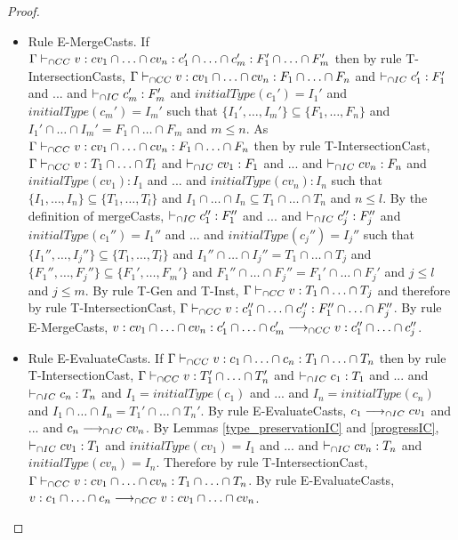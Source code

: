 \documentclass[a4paper]{article}
\begin{document}
\begin{proof}
\begin{itemize}
    \item Rule E-MergeCasts.
    If $\Gamma \vdash_{\cap CC} v : cv_1 \cap \ldots \cap cv_n : c_1' \cap \ldots \cap c_m' : F_1' \cap \ldots \cap F_m'$ then by rule T-IntersectionCasts, $\Gamma \vdash_{\cap CC} v : cv_1 \cap \ldots \cap cv_n : F_1 \cap \ldots \cap F_n$ and $\vdash_{\cap IC} c_1' : F_1'$ and ... and $\vdash_{\cap IC} c_m' : F_m'$ and $initialType(c_1') = I_1'$ and $initialType(c_m') = I_m'$ such that $\{I_1', \ldots, I_m'\} \subseteq \{F_1, \ldots, F_n\}$ and $I_1' \cap \ldots \cap I_m' = F_1 \cap \ldots \cap F_m$ and $m \leq n$.
    As $\Gamma \vdash_{\cap CC} v : cv_1 \cap \ldots \cap cv_n : F_1 \cap \ldots \cap F_n$ then by rule T-IntersectionCast, $\Gamma \vdash_{\cap CC} v : T_1 \cap \ldots \cap T_l$ and $\vdash_{\cap IC} cv_1 : F_1$ and ... and $\vdash_{\cap IC} cv_n : F_n$ and $initialType(cv_1) : I_1$ and ... and $initialType(cv_n) : I_n$ such that $\{I_1, \ldots, I_n\} \subseteq \{T_1, \ldots, T_l\}$ and $I_1 \cap \ldots \cap I_n \subseteq T_1 \cap \ldots \cap T_n$ and $n \leq l$.
    By the definition of mergeCasts, $\vdash_{\cap IC} c_1'' : F_1''$ and ... and $\vdash_{\cap IC} c_j'' : F_j''$ and $initialType(c_1'') = I_1''$ and ... and $initialType(c_j'') = I_j''$ such that $\{I_1'', \ldots, I_j''\} \subseteq \{T_1, \ldots, T_l\}$ and $I_1'' \cap \ldots \cap I_j'' = T_1 \cap \ldots \cap T_j$ and $\{F_1'', \ldots, F_j''\} \subseteq \{F_1', \ldots, F_m'\}$ and $F_1'' \cap \ldots \cap F_j'' = F_1' \cap \ldots \cap F_j'$ and $j \leq l$ and $j \leq m$.
    By rule T-Gen and T-Inst, $\Gamma \vdash_{\cap CC} v : T_1 \cap \ldots \cap T_j$ and therefore by rule T-IntersectionCast, $\Gamma \vdash_{\cap CC} v : c_1'' \cap \ldots \cap c_j'' : F_1'' \cap \ldots \cap F_j''$.
    By rule E-MergeCasts, $v : cv_1 \cap \ldots \cap cv_n : c_1' \cap \ldots \cap c_m' \longrightarrow_{\cap CC} v : c_1'' \cap \ldots \cap c_j''$.
    \item Rule E-EvaluateCasts.
    If $\Gamma \vdash_{\cap CC} v : c_1 \cap \ldots \cap c_n : T_1 \cap \ldots \cap T_n$ then by rule T-IntersectionCast, $\Gamma \vdash_{\cap CC} v : T_1' \cap \ldots \cap T_n'$ and $\vdash_{\cap IC} c_1 : T_1$ and ... and $\vdash_{\cap IC} c_n : T_n$ and $I_1 = initialType(c_1)$ and ... and $I_n = initialType(c_n)$ and $I_1 \cap \ldots \cap I_n = T_1' \cap \ldots \cap T_n'$.
    By rule E-EvaluateCasts, $c_1 \longrightarrow_{\cap IC} cv_1$ and ... and $c_n \longrightarrow_{\cap IC} cv_n$.
    By Lemmas \ref{type_preservationIC} and \ref{progressIC}, $\vdash_{\cap IC} cv_1 : T_1$ and $initialType(cv_1) = I_1$ and ... and $\vdash_{\cap IC} cv_n : T_n$ and $initialType(cv_n) = I_n$.
    Therefore by rule T-IntersectionCast, $\Gamma \vdash_{\cap CC} v : cv_1 \cap \ldots \cap cv_n : T_1 \cap \ldots \cap T_n$.
    By rule E-EvaluateCasts, $v : c_1 \cap \ldots \cap c_n \longrightarrow_{\cap CC} v : cv_1 \cap \ldots \cap cv_n$.

\end{itemize}
\end{proof}
\end{document}

